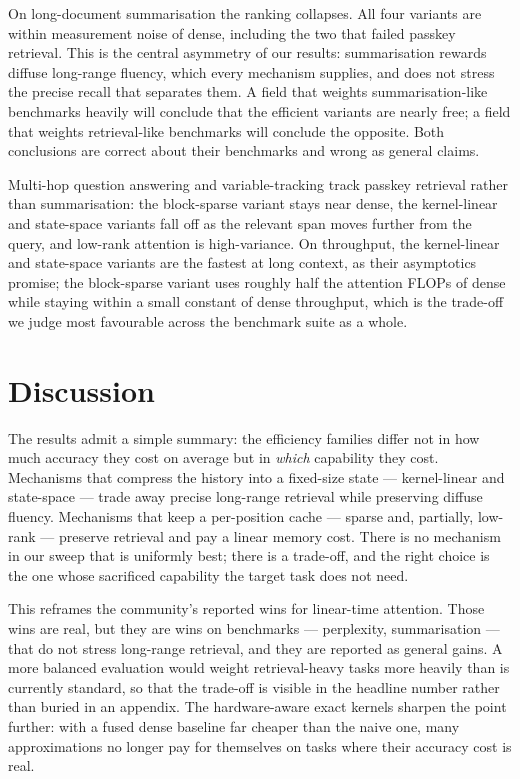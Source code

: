 \documentclass[11pt]{article}
\begin{document}
On long-document summarisation the ranking collapses. All four variants are within measurement noise of dense, including the two that failed passkey retrieval. This is the central asymmetry of our results: summarisation rewards diffuse long-range fluency, which every mechanism supplies, and does not stress the precise recall that separates them. A field that weights summarisation-like benchmarks heavily will conclude that the efficient variants are nearly free; a field that weights retrieval-like benchmarks will conclude the opposite. Both conclusions are correct about their benchmarks and wrong as general claims.

Multi-hop question answering and variable-tracking track passkey retrieval rather than summarisation: the block-sparse variant stays near dense, the kernel-linear and state-space variants fall off as the relevant span moves further from the query, and low-rank attention is high-variance. On throughput, the kernel-linear and state-space variants are the fastest at long context, as their asymptotics promise; the block-sparse variant uses roughly half the attention FLOPs of dense while staying within a small constant of dense throughput, which is the trade-off we judge most favourable across the benchmark suite as a whole.

\section{Discussion}
\label{sec:discussion}

The results admit a simple summary: the efficiency families differ not in how much accuracy they cost on average but in \emph{which} capability they cost. Mechanisms that compress the history into a fixed-size state --- kernel-linear and state-space --- trade away precise long-range retrieval while preserving diffuse fluency. Mechanisms that keep a per-position cache --- sparse and, partially, low-rank --- preserve retrieval and pay a linear memory cost. There is no mechanism in our sweep that is uniformly best; there is a trade-off, and the right choice is the one whose sacrificed capability the target task does not need.

This reframes the community's reported wins for linear-time attention. Those wins are real, but they are wins on benchmarks --- perplexity, summarisation --- that do not stress long-range retrieval, and they are reported as general gains. A more balanced evaluation would weight retrieval-heavy tasks more heavily than is currently standard, so that the trade-off is visible in the headline number rather than buried in an appendix. The hardware-aware exact kernels sharpen the point further: with a fused dense baseline far cheaper than the naive one, many approximations no longer pay for themselves on tasks where their accuracy cost is real.
\end{document}
